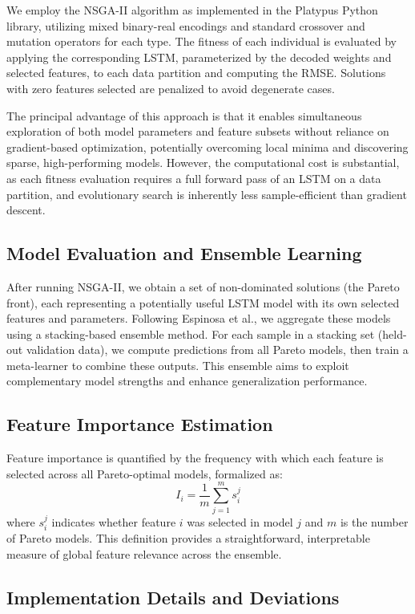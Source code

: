 \documentclass[12pt]{article}
\begin{document}
We employ the NSGA-II algorithm \cite{Miyandoab_2023} as implemented in the Platypus Python library, utilizing mixed binary-real encodings and standard crossover and mutation operators for each type. The fitness of each individual is evaluated by applying the corresponding LSTM, parameterized by the decoded weights and selected features, to each data partition and computing the RMSE. Solutions with zero features selected are penalized to avoid degenerate cases.

The principal advantage of this approach is that it enables simultaneous exploration of both model parameters and feature subsets without reliance on gradient-based optimization, potentially overcoming local minima and discovering sparse, high-performing models. However, the computational cost is substantial, as each fitness evaluation requires a full forward pass of an LSTM on a data partition, and evolutionary search is inherently less sample-efficient than gradient descent.

\subsection{Model Evaluation and Ensemble Learning}

After running NSGA-II, we obtain a set of non-dominated solutions (the Pareto front), each representing a potentially useful LSTM model with its own selected features and parameters. Following Espinosa et al., we aggregate these models using a stacking-based ensemble method. For each sample in a stacking set (held-out validation data), we compute predictions from all Pareto models, then train a meta-learner to combine these outputs. This ensemble aims to exploit complementary model strengths and enhance generalization performance.

\subsection{Feature Importance Estimation}

Feature importance is quantified by the frequency with which each feature is selected across all Pareto-optimal models, formalized as:
\[
I_i = \frac{1}{m} \sum_{j=1}^m s^j_i
\]
where $s^j_i$ indicates whether feature $i$ was selected in model $j$ and $m$ is the number of Pareto models. This definition provides a straightforward, interpretable measure of global feature relevance across the ensemble.

\subsection{Implementation Details and Deviations}
\end{document}
